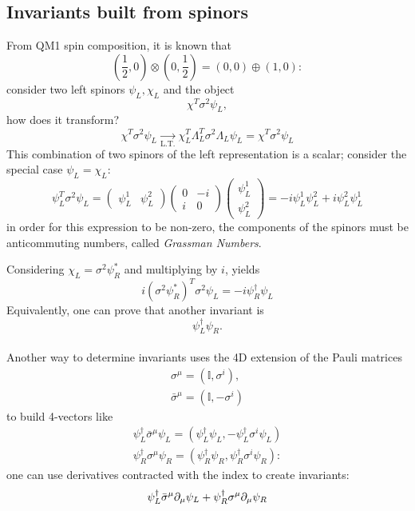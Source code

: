 \subsection{Invariants built from spinors}
From QM1 spin composition, it is known that
$$\left(\frac{1}{2},0\right)\otimes\left(0,\frac{1}{2}\right) = (0,0)\oplus(1,0):$$
consider two left spinors $\psi_L,\chi_L$ and the object
$$\chi^T\sigma^2\psi_L,$$
how does it transform?
$$\chi^T\sigma^2\psi_L\underset{\text{L.T.}}\rightarrow\chi_L^T\Lambda_L^T\sigma^2
\Lambda_L\psi_L = \chi^T\sigma^2\psi_L$$
This combination of two spinors of the left representation is a scalar; consider the
special case $\psi_L =\chi_L$:
$$\psi_L^T\sigma^2\psi_L = \begin{pmatrix}
    \psi_L^1&\psi_L^2
\end{pmatrix}\begin{pmatrix}
    0&-i\\
    i&0
\end{pmatrix}
\begin{pmatrix}
\psi_L^1\\
\psi_L^2
\end{pmatrix}
= -i \psi_L^1\psi_L^2 + i \psi_L^2\psi_L^1
$$
in order for this expression to be non-zero, the components of the spinors must be
anticommuting numbers, called \textit{Grassman Numbers}.

Considering $\chi_L = \sigma^2\psi_R^*$ and multiplying by $i$, yields
$$i(\sigma^2\psi_R^*)^T\sigma^2\psi_L = -i\psi_R^\dagger\psi_L$$
Equivalently, one can prove that another invariant is
$$\psi_L^\dagger\psi_R.$$\\

Another way to determine invariants uses the 4D extension of the Pauli matrices
\begin{gather*}
\sigma^\mu = (\mathbb{I},\sigma^i), \\
\bar\sigma^\mu = (\mathbb{I}, -\sigma^i)
\end{gather*}
to build 4-vectors like
\begin{gather*}
\psi_L^\dagger\bar\sigma^\mu\psi_L=(\psi_L^\dagger\psi_L,
-\psi_L^\dagger\sigma^i\psi_L)\\
\psi_R^\dagger\sigma^\mu\psi_R=(\psi_R^\dagger\psi_R,
\psi_R^\dagger\sigma^i\psi_R):
\end{gather*}
one can use derivatives contracted with the index to create invariants:
\begin{gather*}
\psi_L^\dagger\bar\sigma^\mu\partial_\mu\psi_L+\psi^\dagger_R\sigma^\mu\partial_\mu\psi_R
\end{gather*}

